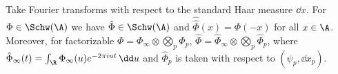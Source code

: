 Take Fourier transforms with respect to the standard Haar measure $\dd x$. For $\Phi\in\Schw(\A)$ we have
$\hat\Phi\in\Schw(\A)$ and $\hat{\hat\Phi}(x)=\Phi(-x)$ for all $x\in\A$. Moreover, for factorizable
$\Phi=\Phi_\infty\otimes\bigotimes_p\Phi_p$, $\hat\Phi=\hat\Phi_\infty\otimes\bigotimes_p\hat\Phi_p$, where
$\hat\Phi_\infty(t)=\int_\R\Phi_\infty(u)e^{-2\pi iut}\,\dd u$ and $\hat\Phi_p$ is taken with respect to $(\psi_p,\dd x_p)$.
